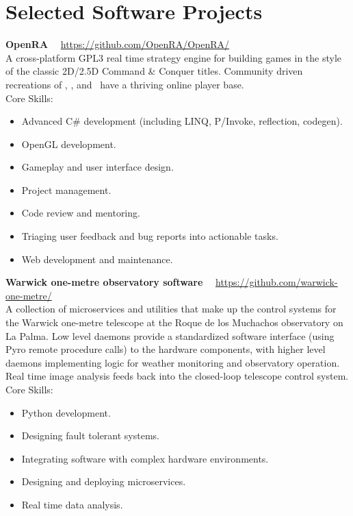 \documentclass[print]{cv-style}
\begin{document}
\section{Selected Software Projects}

\parbox[t]{12.8cm}{%
    \textbf{OpenRA}%
    \hfill%
    {\small\color{lightgray} \faGithub~~\url{https://github.com/OpenRA/OpenRA/}}\\%
    A cross-platform GPL3 real time strategy engine for building games in the style of the classic 2D/2.5D Command \& Conquer titles.  Community driven recreations of , , and ~have a thriving online player base.
    \vspace{\parsep}\\
    Core Skills:
    \begin{itemize}
        \item Advanced C\# development (including LINQ, P/Invoke, reflection, codegen).
        \item OpenGL development.
        \item Gameplay and user interface design.
        \item Project management.
        \item Code review and mentoring.
        \item Triaging user feedback and bug reports into actionable tasks.
        \item Web development and maintenance.
    \end{itemize}
}

\parbox[t]{12.8cm}{%
    \textbf{Warwick one-metre observatory software}%
    \hfill%
    {\footnotesize\color{lightgray} \faGithub~~\url{https://github.com/warwick-one-metre/}}\\%
    A collection of microservices and utilities that make up the control systems for the Warwick one-metre telescope at the Roque de los Muchachos observatory on La Palma.  Low level daemons provide a standardized software interface (using Pyro remote procedure calls) to the hardware components, with higher level daemons implementing logic for weather monitoring and observatory operation.  Real time image analysis feeds back into the closed-loop telescope control system.
    \vspace{\parsep}\\
    Core Skills:
    \begin{itemize}
      \item Python development.
      \item Designing fault tolerant systems.
      \item Integrating software with complex hardware environments.
      \item Designing and deploying microservices.
      \item Real time data analysis.
    \end{itemize}
}
\end{document}

